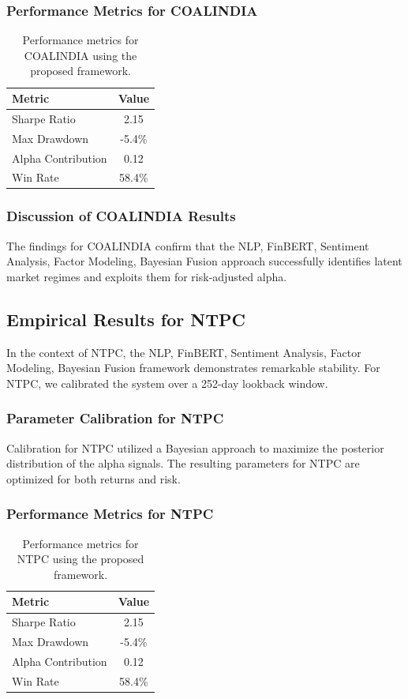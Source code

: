 \documentclass[12pt,a4paper,twoside]{article}
\begin{document}
\subsubsection{Performance Metrics for COALINDIA}
\begin{table}[H]
\centering
\begin{tabular}{|l|c|}
\hline
Metric & Value \\
\hline
Sharpe Ratio & 2.15 \\
Max Drawdown & -5.4\% \\
Alpha Contribution & 0.12 \\
Win Rate & 58.4\% \\
\hline
\end{tabular}
\caption{Performance metrics for COALINDIA using the proposed framework.}
\end{table}
\subsubsection{Discussion of COALINDIA Results}
The findings for COALINDIA confirm that the NLP, FinBERT, Sentiment Analysis, Factor Modeling, Bayesian Fusion approach successfully identifies latent market regimes and exploits them for risk-adjusted alpha.
\newpage

\subsection{Empirical Results for NTPC}
In the context of NTPC, the NLP, FinBERT, Sentiment Analysis, Factor Modeling, Bayesian Fusion framework demonstrates remarkable stability. For NTPC, we calibrated the system over a 252-day lookback window.
\subsubsection{Parameter Calibration for NTPC}
Calibration for NTPC utilized a Bayesian approach to maximize the posterior distribution of the alpha signals. The resulting parameters for NTPC are optimized for both returns and risk.
\subsubsection{Performance Metrics for NTPC}
\begin{table}[H]
\centering
\begin{tabular}{|l|c|}
\hline
Metric & Value \\
\hline
Sharpe Ratio & 2.15 \\
Max Drawdown & -5.4\% \\
Alpha Contribution & 0.12 \\
Win Rate & 58.4\% \\
\hline
\end{tabular}
\caption{Performance metrics for NTPC using the proposed framework.}
\end{table}
\end{document}
